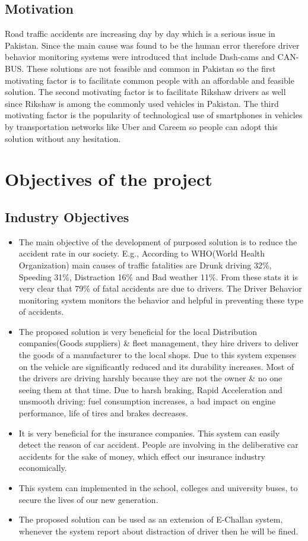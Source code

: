 \section{Motivation}
Road traffic accidents are increasing day by day which is a serious issue in
Pakistan. Since the main cause was found to be the human error therefore
driver behavior monitoring systems were introduced that include Dash-cams
and CAN-BUS. These solutions are not feasible and common in Pakistan so
the first motivating factor is to facilitate common people with an affordable and
feasible solution. The second motivating factor is to facilitate Rikshaw drivers
as well since Rikshaw is among the commonly used vehicles in Pakistan. The
third motivating factor is the popularity of technological use of smartphones in
vehicles by transportation networks like Uber and Careem so people can
adopt this solution without any hesitation.

\chapter{Objectives of the project}
\section{Industry Objectives}
\begin{itemize}
\item The main objective of the development of purposed solution is to reduce the accident
rate in our society. E.g., According to WHO(World Health Organization) main causes of
traffic fatalities are Drunk driving 32\%, Speeding 31\%, Distraction 16\% and Bad weather
11\%. From these stats it is very clear that 79\% of fatal accidents are due to drivers. The
Driver Behavior monitoring system monitors the behavior and helpful in preventing these
type of accidents.
\item The proposed solution is very beneficial for the local Distribution companies(Goods
suppliers) \& fleet management, they hire drivers to deliver the goods of a manufacturer
to the local shops. Due to this system expenses on the vehicle are significantly reduced
and its durability increases. Most of the drivers are driving harshly because they are not
the owner \& no one seeing them at that time. Due to harsh braking, Rapid Acceleration
and unsmooth driving: fuel consumption increases, a bad impact on engine
performance, life of tires and brakes decreases.
\item It is very beneficial for the insurance companies. This system can easily detect the
reason of car accident. People are involving in the deliberative car accidents for the sake
of money, which effect our insurance industry economically.
\item This system can implemented in the school, colleges and university buses, to secure the
lives of our new generation.
\item The proposed solution can be used as an extension of E-Challan system, whenever the
system report about distraction of driver then he will be fined.
\end{itemize}

